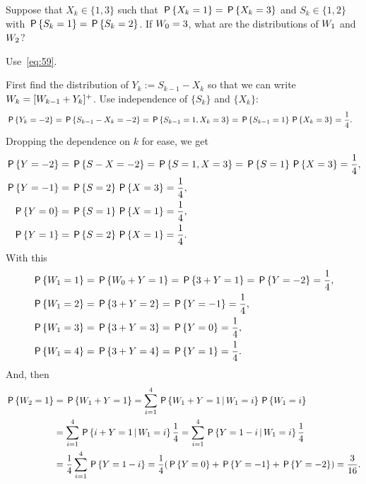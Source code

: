 \begin{exercise}\label{ex:85}
 Suppose that $X_k\in\{1,3\}$ such that $\P{X_k=1}=\P{X_k=3}$ and
 $S_k\in\{1,2\}$ with $\P{S_k=1}=\P{S_k=2}$. If $\W_{0}=3$, what are
 the distributions of $\W_{1}$ and $\W_{2}$?
\begin{hint}
Use~\cref{eq:59}.
\end{hint}
\begin{solution} First find the distribution of $Y_k:=S_{k-1}-X_k$ so that we can write
 $\W_{k}=[\W_{k-1}+Y_k]^+$. Use independence of $\{S_k\}$ and $\{X_k\}$:
\begin{align*}
 \P{Y_k=-2} &=\P{S_{k-1}-X_k=-2} = \P{S_{k-1}=1, X_k=3} = \P{S_{k-1}=1}\P{X_k=3} = \frac14.
\end{align*}
Dropping the dependence on $k$ for ease, we get
\begin{align*}
 \P{Y=-2} &=\P{S-X=-2} = \P{S=1, X=3} = \P{S=1}\P{X=3} = \frac14,\\
 \P{Y=-1} &=\P{S=2}\P{X=3} = \frac14,\\
 \P{Y=0} &=\P{S=1}\P{X=1} = \frac14,\\
 \P{Y=1} &=\P{S=2}\P{X=1} = \frac14.
\end{align*}
With this
 \begin{align*}
 \P{\W_{1} = 1} &=\P{\W_{0} + Y= 1} = \P{3 + Y =1} = \P{Y=-2} =\frac14,\\
 \P{\W_{1} = 2} &= \P{3 + Y =2} = \P{Y=-1} =\frac14,\\
 \P{\W_{1} = 3} &= \P{3 + Y = 3} = \P{Y=0} =\frac14,\\
 \P{\W_{1} = 4} &= \P{3 + Y = 4} = \P{Y=1} =\frac14.\\
 \end{align*}
And, then
 \begin{equation*}
 \begin{split}
 \P{\W_{2} = 1}
&=\P{\W_{1} + Y = 1} = \sum_{i=1}^4 \P{\W_{1} + Y = 1\given \W_{1}=i}\P{\W_{1}=i}\\
&=\sum_{i=1}^4 \P{i + Y = 1\given \W_{1}=i}\frac14
=\sum_{i=1}^4 \P{Y = 1-i\given \W_{1}=i}\frac14\\
&=\frac14\sum_{i=1}^4 \P{Y = 1-i} = \frac14(\P{Y = 0} + \P{Y=-1} +\P{Y=-2}) = \frac{3}{16}.
 \end{split}
 \end{equation*}


\end{solution}
\end{exercise}



